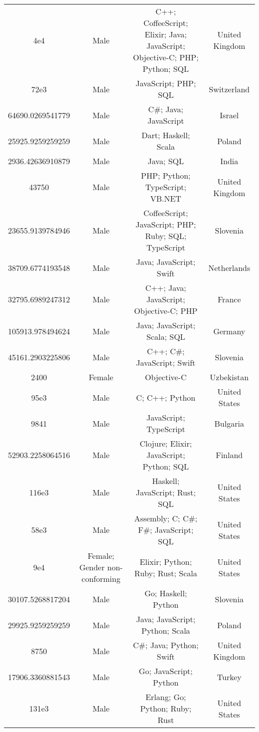 \begin{center}
\begin{tabular}{ |c|c|c|c| }
4e4  &  Male  &  C++; CoffeeScript; Elixir; Java; JavaScript; Objective-C; PHP; Python; SQL  &  United Kingdom  \\ 
72e3  &  Male  &  JavaScript; PHP; SQL  &  Switzerland  \\ 
64690.0269541779  &  Male  &  C\#; Java; JavaScript  &  Israel  \\ 
25925.9259259259  &  Male  &  Dart; Haskell; Scala  &  Poland  \\ 
2936.42636910879  &  Male  &  Java; SQL  &  India  \\ 
43750  &  Male  &  PHP; Python; TypeScript; VB.NET  &  United Kingdom  \\ 
23655.9139784946  &  Male  &  CoffeeScript; JavaScript; PHP; Ruby; SQL; TypeScript  &  Slovenia  \\ 
38709.6774193548  &  Male  &  Java; JavaScript; Swift  &  Netherlands  \\ 
32795.6989247312  &  Male  &  C++; Java; JavaScript; Objective-C; PHP  &  France  \\ 
105913.978494624  &  Male  &  Java; JavaScript; Scala; SQL  &  Germany  \\ 
45161.2903225806  &  Male  &  C++; C\#; JavaScript; Swift  &  Slovenia  \\ 
2400  &  Female  &  Objective-C  &  Uzbekistan  \\ 
95e3  &  Male  &  C; C++; Python  &  United States  \\ 
9841  &  Male  &  JavaScript; TypeScript  &  Bulgaria  \\ 
52903.2258064516  &  Male  &  Clojure; Elixir; JavaScript; Python; SQL  &  Finland  \\ 
116e3  &  Male  &  Haskell; JavaScript; Rust; SQL  &  United States  \\ 
58e3  &  Male  &  Assembly; C; C\#; F\#; JavaScript; SQL  &  United States  \\ 
9e4  &  Female; Gender non-conforming  &  Elixir; Python; Ruby; Rust; Scala  &  United States  \\ 
30107.5268817204  &  Male  &  Go; Haskell; Python  &  Slovenia  \\ 
29925.9259259259  &  Male  &  Java; JavaScript; Python; Scala  &  Poland  \\ 
8750  &  Male  &  C\#; Java; Python; Swift  &  United Kingdom  \\ 
17906.3360881543  &  Male  &  Go; JavaScript; Python  &  Turkey  \\ 
131e3  &  Male  &  Erlang; Go; Python; Ruby; Rust  &  United States  \\ 

\end{tabular}
\end{center}
